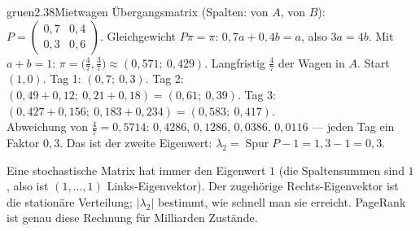 \begin{loesungkarte}{gruen}{2.38}{Mietwagen}
Übergangsmatrix (Spalten: von $A$, von $B$): $P = \begin{pmatrix}0{,}7 & 0{,}4\\ 0{,}3 & 0{,}6\end{pmatrix}$. Gleichgewicht $P\pi = \pi$: $0{,}7a + 0{,}4b = a$, also $3a = 4b$. Mit $a + b = 1$: $\pi = \bigl(\frac47, \frac37\bigr)\approx(0{,}571;\ 0{,}429)$. Langfristig $\frac47$ der Wagen in $A$.
Start $(1, 0)$. Tag 1: $(0{,}7;\ 0{,}3)$. Tag 2: $(0{,}49 + 0{,}12;\ 0{,}21 + 0{,}18) = (0{,}61;\ 0{,}39)$. Tag 3: $(0{,}427 + 0{,}156;\ 0{,}183 + 0{,}234) = (0{,}583;\ 0{,}417)$. \\
Abweichung von $\frac47 = 0{,}5714$: $0{,}4286$, $0{,}1286$, $0{,}0386$, $0{,}0116$ --- jeden Tag ein Faktor $0{,}3$. Das ist der zweite Eigenwert: $\lambda_2 = \operatorname{Spur}P - 1 = 1{,}3 - 1 = 0{,}3$.
\begin{mitnehmen}\kastentext
Eine stochastische Matrix hat immer den Eigenwert $1$ (die Spaltensummen sind $1$, also ist $(1, \dots, 1)$ Links-Eigenvektor). Der zugehörige Rechts-Eigenvektor ist die stationäre Verteilung; $|\lambda_2|$ bestimmt, wie schnell man sie erreicht. PageRank ist genau diese Rechnung für Milliarden Zustände.
\end{mitnehmen}
\end{loesungkarte}

